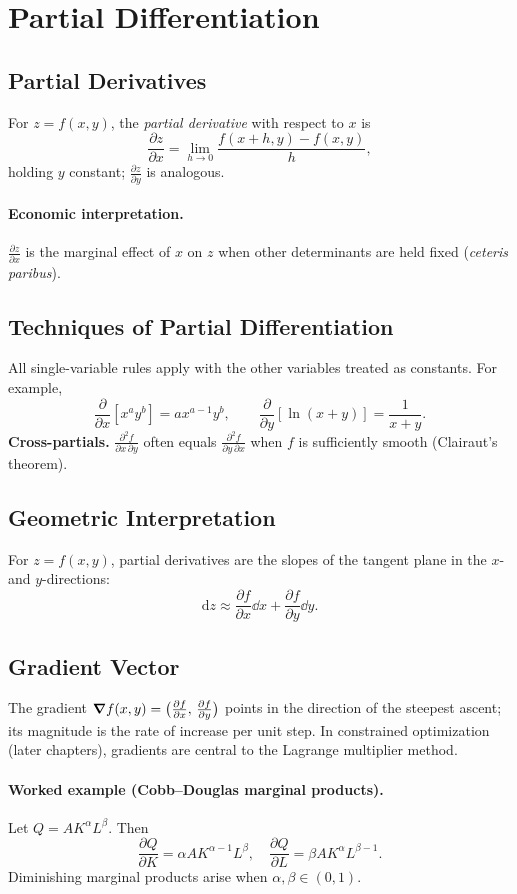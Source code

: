 \documentclass[11pt]{article}
\newcommand{\pd}[2]{\frac{\partial #1}{\partial #2}}
\newcommand{\pdmixed}[3]{\frac{\partial^2 #1}{\partial #2\,\partial #3}}
\begin{document}
\section{Partial Differentiation}

\subsection*{Partial Derivatives}
For $z=f(x,y)$, the \emph{partial derivative} with respect to $x$ is
\[
\pd{z}{x}=\lim_{h\to 0}\frac{f(x+h,y)-f(x,y)}{h},
\]
holding $y$ constant; $\pd{z}{y}$ is analogous.

\paragraph{Economic interpretation.}
$\pd{z}{x}$ is the marginal effect of $x$ on $z$ when other determinants are held fixed (\textit{ceteris paribus}).

\subsection*{Techniques of Partial Differentiation}
All single-variable rules apply with the other variables treated as constants. For example,
\[
\pd{}{x}\left[x^a y^b\right]=a x^{a-1} y^b,\qquad
\pd{}{y}\left[\ln(x+y)\right]=\frac{1}{x+y}.
\]
\textbf{Cross-partials.} $\pdmixed{f}{x}{y}$ often equals $\pdmixed{f}{y}{x}$ when $f$ is sufficiently smooth (Clairaut's theorem).

\subsection*{Geometric Interpretation}
For $z=f(x,y)$, partial derivatives are the slopes of the tangent plane in the $x$- and $y$-directions:
\[
\mathrm{d}z\approx \pd{f}{x}\dd x+\pd{f}{y}\dd y.
\]

\subsection*{Gradient Vector}
The gradient $\grad f(x,y)=\big(\pd{f}{x},\,\pd{f}{y}\big)$ points in the direction of the steepest ascent; its magnitude is the rate of increase per unit step. In constrained optimization (later chapters), gradients are central to the Lagrange multiplier method.

\paragraph{Worked example (Cobb--Douglas marginal products).}
Let $Q=AK^\alpha L^\beta$. Then
\[
\pd{Q}{K}=\alpha A K^{\alpha-1}L^\beta,\quad 
\pd{Q}{L}=\beta A K^{\alpha}L^{\beta-1}.
\]
Diminishing marginal products arise when $\alpha,\beta\in(0,1)$.
\end{document}
